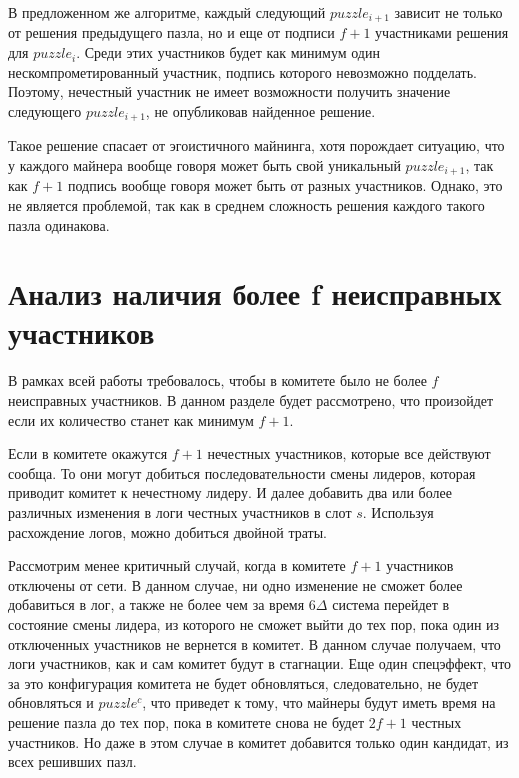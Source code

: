 В предложенном же алгоритме, каждый следующий $puzzle_{i+1}$ зависит не только от решения предыдущего пазла, но и еще от подписи $f+1$ участниками решения для $puzzle_i$. Среди этих участников будет как минимум один нескомпрометированный  участник, подпись которого невозможно подделать. Поэтому, нечестный участник не имеет возможности получить значение следующего $puzzle_{i+1}$, не опубликовав найденное решение.

Такое решение спасает от эгоистичного майнинга, хотя порождает ситуацию, что у каждого майнера вообще говоря может быть свой уникальный $puzzle_{i+1}$, так как $f+1$ подпись вообще говоря может быть от разных участников. Однако, это не является проблемой, так как в среднем сложность решения каждого такого пазла одинакова.
 
\section{Анализ наличия более f неисправных участников}
В рамках всей работы требовалось, чтобы в комитете было не более $f$ неисправных участников.
В данном разделе будет рассмотрено, что произойдет если их количество станет как минимум $f+1$.

Если в комитете окажутся $f+1$ нечестных участников, которые все действуют сообща. То они могут добиться последовательности смены лидеров, которая приводит комитет к нечестному лидеру. И далее добавить два или более различных изменения в логи честных участников в слот $s$. Используя расхождение логов, можно добиться двойной траты.

Рассмотрим менее критичный случай, когда в комитете $f+1$ участников отключены от сети. В данном случае, ни одно изменение не сможет более добавиться в лог, а также не более чем за время $6\Delta$ система перейдет в состояние смены лидера, из которого не сможет выйти до тех пор, пока один из отключенных участников не вернется в комитет. В данном случае получаем, что логи участников, как и сам комитет будут в стагнации. Еще один спецэффект, что за это конфигурация комитета не будет обновляться, следовательно, не будет обновляться и $puzzle^c$, что приведет к тому, что майнеры будут иметь время на решение пазла до тех пор, пока в комитете снова не будет $2f+1$ честных участников. Но даже в этом случае в комитет добавится только один кандидат, из всех решивших пазл.